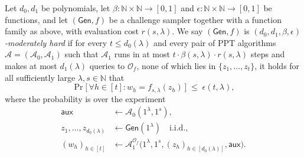 \documentclass{conjura-conjecture}
\newcommand{\NN}{\mathbb{N}}
\newcommand{\Gen}{\mathsf{Gen}}
\newcommand{\aux}{\mathsf{aux}}
\newcommand{\Adv}{\mathcal{A}}
\newcommand{\Orc}{\mathcal{O}}
\begin{document}
\begin{definition}\label{def:mh}
Let $d_0, d_1$ be polynomials, let $\beta : \NN \times \NN \to [0,1]$ and $\epsilon : \NN \times \NN \to [0,1]$ be functions, and let $(\Gen, f)$ be a challenge sampler together with a function family as above, with evaluation cost $r(s,\lambda)$. We say $(\Gen, f)$ is \emph{$(d_0,d_1,\beta,\epsilon)$-moderately hard} if for every $t \le d_0(\lambda)$ and every pair of PPT algorithms $\Adv = (\Adv_0, \Adv_1)$ such that $\Adv_1$ runs in at most $t \cdot \beta(s,\lambda) \cdot r(s,\lambda)$ steps and makes at most $d_1(\lambda)$ queries to $\Orc_f$, none of which lies in $\{z_1,\dots,z_t\}$, it holds for all sufficiently large $\lambda, s \in \NN$ that
\[
\Pr\bigl[\, \forall h \in [t] : w_h = f_{s,\lambda}(z_h) \,\bigr] \;\le\; \epsilon(t,\lambda),
\]
where the probability is over the experiment
\begin{align*}
\aux &\leftarrow \Adv_0(1^{\lambda},1^{s}), \\
z_1,\dots,z_{d_0(\lambda)} &\leftarrow \Gen(1^{\lambda}) \quad \text{i.i.d.}, \\
(w_h)_{h \in [t]} &\leftarrow \Adv_1^{\Orc_f}\bigl(1^{\lambda},1^{s},(z_h)_{h \in [d_0(\lambda)]},\aux\bigr).
\end{align*}
\end{definition}
\end{document}
